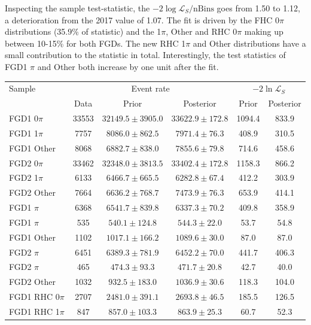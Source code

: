 Inspecting the sample test-statistic, the $-2\log\mathcal{L}_S/\text{nBins}$ goes from 1.50 to 1.12, a deterioration from the 2017 value of 1.07. The fit is driven by the FHC 0$\pi$ distributions (35.9\% of statistic) and the 1$\pi$, Other and RHC 0$\pi$ making up between 10-15\% for both FGDs. The new RHC 1$\pi$ and Other distributions have a small contribution to the statistic in total. Interestingly, the test statistics of FGD1 $\pi$ and Other both increase by one unit after the fit.
\begin{table}
	\centering
	\begin{tabular}{ l | c c c | c c }
		\hline
		\hline
		Sample 			& \multicolumn{3}{c|}{Event rate} & \multicolumn{2}{c}{$-2\ln\mathcal{L}_S$} \\
		& Data	& Prior & Posterior & Prior & Posterior \\
		\hline
		FGD1 0$\pi$ 	& 33553	& $32149.5\pm3905.0$ 	& $33622.9\pm172.8$ & 1094.4  & 833.9 	\\ 
		FGD1 1$\pi$ 	& 7757 	& $8086.0\pm862.5$	& $7971.4\pm76.3$  & 408.9  & 310.5 	\\ 
		FGD1 Other 		& 8068 	& $6882.7\pm838.0$	& $7855.6\pm79.8$  & 714.6  & 458.6 	\\ 
		\hline
		FGD2 0$\pi$ 	& 33462 & $32348.0\pm3813.5$	& $33402.4\pm172.8$ & 1158.3  & 866.2 	\\ 
		FGD2 1$\pi$ 	& 6133 	& $6466.7\pm665.5$	& $6282.8\pm67.4$  & 412.2 & 303.9 	\\ 
		FGD2 Other 		& 7664 	& $6636.2\pm768.7$	& $7473.9\pm76.3$  & 653.9  & 414.1 	\\ 
		\hline
		FGD1 \numubar 0$\pi$ 	& 6368 	& $6541.7\pm839.8$	& $6337.3\pm70.2$  & 409.8  & 358.9 	\\ 
		FGD1 \numubar 1$\pi$ 	& 535 	& $540.1\pm124.8$	& $544.3\pm22.0$  & 53.7  & 54.8 	\\ 
		FGD1 \numubar Other 	& 1102 	& $1017.1\pm166.2$	& $1089.6\pm30.0$  & 87.0  &  87.0	\\ 
		\hline
		FGD2 \numubar 0$\pi$ 	& 6451  & $6389.3\pm781.9$	& $6452.2\pm70.0$ & 441.7  & 406.3	\\ 
		FGD2 \numubar 1$\pi$ 	& 465 	& $474.3\pm93.3$	& $471.7\pm20.8$  & 42.7 & 40.0 	\\ 
		FGD2 \numubar Other 	& 1032 	& $932.5\pm183.0$	& $1036.9\pm30.6$  & 118.3  & 104.0 	\\ 
		\hline
		FGD1 \numu RHC 0$\pi$ 	& 2707 	& $2481.0\pm391.1$	& $2693.8\pm46.5$  & 185.5  & 126.5 	\\ 
		FGD1 \numu RHC 1$\pi$ 	& 847 	& $857.0\pm103.3$	& $863.9\pm25.3$  & 60.7  & 52.3 	\\ 

\end{tabular}
\end{table}
